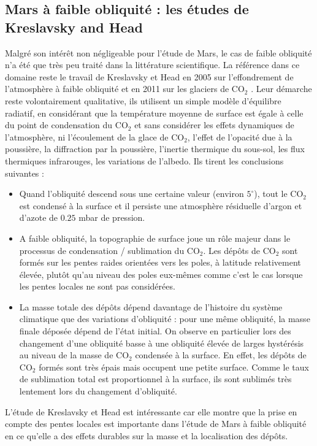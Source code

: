 \documentclass[11pt,a4paper]{article}
\begin{document}
\subsection{Mars à faible obliquité : les études de Kreslavsky and Head}
Malgré son intérêt non négligeable pour l'étude de Mars, le cas de faible obliquité n'a été que très peu traité dans la littérature scientifique. La référence dans ce domaine reste le travail de Kreslavsky et Head en 2005 sur l'effondrement de l'atmosphère à faible obliquité \citep{Kres:05} et en 2011 sur les glaciers de CO$_2$ \citep{Kres:11}. Leur démarche reste volontairement qualitative, ils utilisent un simple modèle d'équilibre radiatif, en considérant que la température moyenne de surface est égale à celle du point de condensation du CO$_2$ et sans considérer les effets dynamiques de l'atmosphère, ni l'écoulement de la glace de CO$_2$, l'effet de l'opacité due à la poussière, la diffraction par la poussière, l'inertie thermique du sous-sol, les flux thermiques infrarouges, les variations de l'albedo. Ils tirent les conclusions suivantes :
\begin{itemize}
\item Quand l'obliquité descend sous une certaine valeur (environ $5^\circ$), tout le CO$_2$ est condensé à la surface et il persiste une atmosphère résiduelle d'argon et d'azote de $0.25$ mbar de pression.
\item A faible obliquité, la topographie de surface joue un rôle majeur dans le processus de condensation / sublimation du CO$_2$. Les dépôts de CO$_2$ sont formés sur les pentes raides orientées vers les poles, à latitude relativement élevée, plutôt qu'au niveau des poles eux-mêmes comme c'est le cas lorsque les pentes locales ne sont pas considérées.
\item La masse totale des dépôts dépend davantage de l'histoire du système climatique que des variations d'obliquité : pour une même obliquité, la masse finale déposée dépend de l'état initial. On observe en particulier lors des changement d'une obliquité basse à une obliquité élevée de larges hystérésis au niveau de la masse de CO$_2$ condensée à la surface. En effet, les dépôts de CO$_2$ formés sont très épais mais occupent une petite surface. Comme le taux de sublimation total est proportionnel à la surface, ils sont sublimés très lentement lors du changement d'obliquité. \\
\end{itemize} 

L'étude de Kreslavsky et Head est intéressante car elle montre que la prise en compte des pentes locales est importante dans l'étude de Mars à faible obliquité en ce qu'elle a des effets durables sur la masse et la localisation des dépôts.
\end{document}
